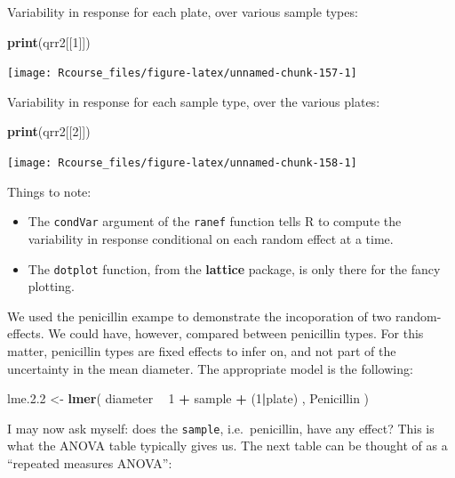 \documentclass[]{book}
\newenvironment{Shaded}{\begin{snugshade}}{\end{snugshade}}
\newcommand{\KeywordTok}[1]{\textcolor[rgb]{0.13,0.29,0.53}{\textbf{#1}}}
\newcommand{\DecValTok}[1]{\textcolor[rgb]{0.00,0.00,0.81}{#1}}
\newcommand{\FloatTok}[1]{\textcolor[rgb]{0.00,0.00,0.81}{#1}}
\newcommand{\StringTok}[1]{\textcolor[rgb]{0.31,0.60,0.02}{#1}}
\newcommand{\OperatorTok}[1]{\textcolor[rgb]{0.81,0.36,0.00}{\textbf{#1}}}
\newcommand{\NormalTok}[1]{#1}
\providecommand{\tightlist}{%
  \setlength{\itemsep}{0pt}\setlength{\parskip}{0pt}}
\theoremstyle{definition}
\theoremstyle{definition}
\theoremstyle{definition}
\theoremstyle{remark}
\begin{document}
Variability in response for each plate, over various sample types:

\begin{Shaded}
\begin{Highlighting}[]
\KeywordTok{print}\NormalTok{(qrr2[[}\DecValTok{1}\NormalTok{]]) }
\end{Highlighting}
\end{Shaded}

\texttt{[image: Rcourse\_files/figure-latex/unnamed-chunk-157-1]}

Variability in response for each sample type, over the various plates:

\begin{Shaded}
\begin{Highlighting}[]
\KeywordTok{print}\NormalTok{(qrr2[[}\DecValTok{2}\NormalTok{]])  }
\end{Highlighting}
\end{Shaded}

\texttt{[image: Rcourse\_files/figure-latex/unnamed-chunk-158-1]}

Things to note:

\begin{itemize}
\tightlist
\item
  The \texttt{condVar} argument of the \texttt{ranef} function tells R
  to compute the variability in response conditional on each random
  effect at a time.
\item
  The \texttt{dotplot} function, from the \textbf{lattice} package, is
  only there for the fancy plotting.
\end{itemize}

We used the penicillin exampe to demonstrate the incoporation of two
random-effects. We could have, however, compared between penicillin
types. For this matter, penicillin types are fixed effects to infer on,
and not part of the uncertainty in the mean diameter. The appropriate
model is the following:

\begin{Shaded}
\begin{Highlighting}[]
\NormalTok{lme.}\FloatTok{2.2}\NormalTok{ <-}\StringTok{ }\KeywordTok{lmer}\NormalTok{( diameter }\OperatorTok{~}\StringTok{  }\DecValTok{1}  \OperatorTok{+}\StringTok{ }\NormalTok{sample }\OperatorTok{+}\StringTok{ }\NormalTok{(}\DecValTok{1}\OperatorTok{|}\NormalTok{plate) , Penicillin )}
\end{Highlighting}
\end{Shaded}

I may now ask myself: does the \texttt{sample}, i.e.~penicillin, have
any effect? This is what the ANOVA table typically gives us. The next
table can be thought of as a ``repeated measures ANOVA'':
\end{document}

